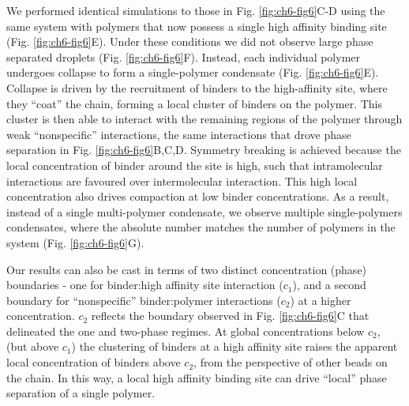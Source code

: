 \documentclass[../main.tex]{subfiles}
\begin{document}
        We performed identical simulations to those in Fig. \ref{fig:ch6-fig6}C-D using the same system with polymers that now possess a single high affinity binding site (Fig. \ref{fig:ch6-fig6}E). Under these conditions we did not observe large phase separated droplets (Fig. \ref{fig:ch6-fig6}F). Instead, each individual polymer undergoes collapse to form a single-polymer condensate (Fig. \ref{fig:ch6-fig6}E). Collapse is driven by the recruitment of binders to the high-affinity site, where they “coat” the chain, forming a local cluster of binders on the polymer. This cluster is then able to interact with the remaining regions of the polymer through weak “nonspecific” interactions, the same interactions that drove phase separation in Fig. \ref{fig:ch6-fig6}B,C,D. Symmetry breaking is achieved because the local concentration of binder around the site is high, such that intramolecular interactions are favoured over intermolecular interaction. This high local concentration also drives compaction at low binder concentrations. As a result, instead of a single multi-polymer condensate, we observe multiple single-polymers condensates, where the absolute number matches the number of polymers in the system (Fig. \ref{fig:ch6-fig6}G). 

        Our results can also be cast in terms of two distinct concentration (phase) boundaries - one for binder:high affinity site interaction ($c_1$), and a second boundary for “nonspecific” binder:polymer interactions ($c_2$) at a higher concentration. $c_2$ reflects the boundary observed in Fig. \ref{fig:ch6-fig6}C that delineated the one and two-phase regimes. At global concentrations below $c_2$, (but above $c_1$) the clustering of binders at a high affinity site raises the apparent local concentration of binders above $c_2$, from the perspective of other beads on the chain. In this way, a local high affinity binding site can drive “local” phase separation of a single polymer.
\end{document}
